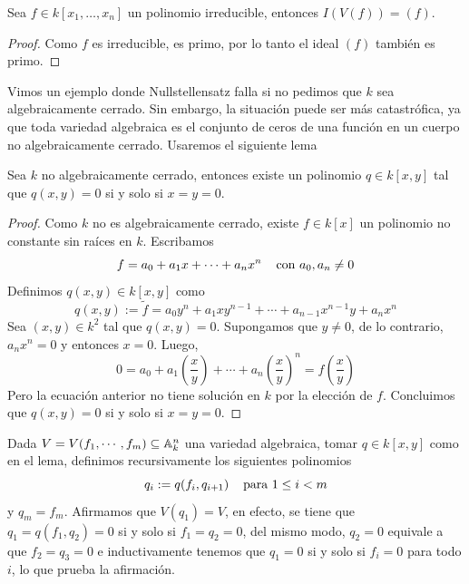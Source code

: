 \documentclass[11pt]{article}
\begin{document}
\begin{cor}
    Sea $f\in k[x_{1},\dots,x_{n}]$ un polinomio irreducible, entonces $I(V(f))=(f)$.
\end{cor}

\begin{proof}
    Como $f$ es irreducible, es primo, por lo tanto el ideal $(f)$ también es primo.
\end{proof}

\noindent Vimos un ejemplo donde Nullstellensatz falla si no pedimos que $k$ sea algebraicamente
cerrado. Sin embargo, la situación puede ser más catastrófica, ya que toda variedad algebraica es
el conjunto de ceros de una función en un cuerpo no algebraicamente cerrado. Usaremos el siguiente
lema

\begin{lema}
    Sea $k$ no algebraicamente cerrado, entonces existe un polinomio $q\in k[x,y]$ tal que 
    $q(x,y)=0$ si y solo si $x=y=0$.
\end{lema}

\begin{proof}
    Como $k$ no es algebraicamente cerrado, existe $f\in k[x]$ un polinomio no constante sin 
    raíces en $k$. Escribamos
    \begin{equation*}
        f=a_{0}+a_{1}x+\cdots+a_{n}x^{n} \hspace{4mm}\text{con }a_{0},a_{n}\neq0
    \end{equation*}
    Definimos $q(x,y)\in k[x,y]$ como
    \begin{equation*}
        q(x,y):=\widetilde{f}=a_{0}y^{n}+a_{1}xy^{n-1}+\cdots+a_{n-1}x^{n-1}y+a_{n}x^{n}
    \end{equation*}
    Sea $(x,y)\in k^{2}$ tal que $q(x,y)=0$. Supongamos que $y\neq0$, de lo contrario, 
    $a_{n}x^{n}=0$ y entonces $x=0$. Luego,
    \begin{equation*}
        0=a_{0}+a_{1}\left(\frac{x}{y}\right)+\cdots+a_{n}\left(\frac{x}{y}\right)^{n}
        =f\left(\frac{x}{y}\right)
    \end{equation*}
    Pero la ecuación anterior no tiene solución en $k$ por la elección de $f$. Concluimos que
    $q(x,y)=0$ si y solo si $x=y=0$.
\end{proof}

\vspace{1mm}
\noindent Dada $V=V(f_{1},\cdots,f_{m})\subseteq\mathbb{A}_{k}^{n}$ una variedad algebraica, tomar 
$q\in k[x,y]$ como en el lema, definimos recursivamente los siguientes polinomios
\begin{equation*}
    q_{i}:=q(f_{i},q_{i+1}) \hspace{4mm}\text{para }1\leq i<m
\end{equation*}
y $q_{m}=f_{m}$. Afirmamos que $V(q_{1})=V$, en efecto, se tiene que $q_{1}=q(f_{1},q_{2})=0$ si y 
solo si $f_{1}=q_{2}=0$, del mismo modo, $q_{2}=0$ equivale a que $f_{2}=q_{3}=0$ e inductivamente 
tenemos que $q_{1}=0$ si y solo si $f_{i}=0$ para todo $i$, lo que prueba la afirmación.
\end{document}
